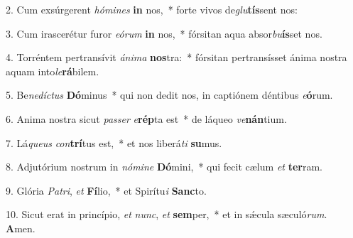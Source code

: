 2. Cum exsúrgerent \textit{hó}\textit{mi}\textit{nes} \textbf{in} nos,~*  forte vivos de\textit{glu}\textbf{tís}sent nos:\

3. Cum irascerétur furor \textit{e}\textit{ó}\textit{rum} \textbf{in} nos,~*  fórsitan aqua absor\textit{bu}\textbf{ís}set nos.\

4. Torréntem pertransívit \textit{á}\textit{ni}\textit{ma} \textbf{nos}tra:~*  fórsitan pertransísset ánima nostra aquam into\textit{le}\textbf{rá}bilem.\

5. Be\textit{ne}\textit{díc}\textit{tus} \textbf{Dó}minus~*  qui non dedit nos, in captiónem déntibus \textit{e}\textbf{ó}rum.\

6. Anima nostra sicut \textit{pas}\textit{ser} \textit{e}\textbf{rép}ta est~*  de láqueo \textit{ve}\textbf{nán}tium.\

7. Lá\textit{que}\textit{us} \textit{con}\textbf{trí}tus est,~*  et nos liberá\textit{ti} \textbf{su}mus.\

8. Adjutórium nostrum in \textit{nó}\textit{mi}\textit{ne} \textbf{Dó}mini,~*  qui fecit cælum \textit{et} \textbf{ter}ram.\

9. Glória \textit{Pa}\textit{tri}, \textit{et} \textbf{Fí}lio,~*  et Spirítu\textit{i} \textbf{Sanc}to.\

10. Sicut erat in princípio, \textit{et} \textit{nunc}, \textit{et} \textbf{sem}per,~*  et in sǽcula sæculó\textit{rum}. \textbf{A}men.\


